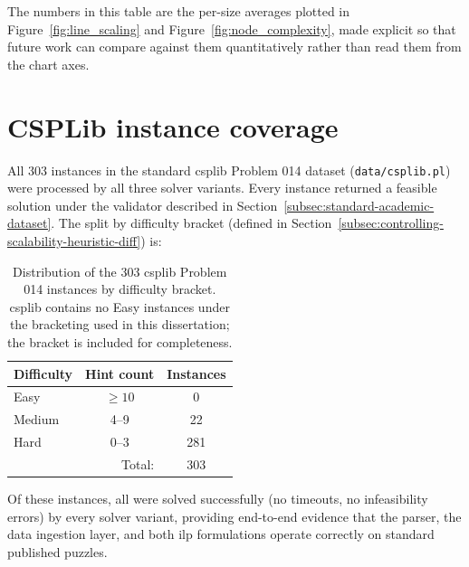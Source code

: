 The numbers in this table are the per-size averages plotted in Figure~\ref{fig:line_scaling} and Figure~\ref{fig:node_complexity}, made explicit so that future work can compare against them quantitatively rather than read them from the chart axes.

\section{CSPLib instance coverage}\label{app:csplib-coverage}

All 303 instances in the standard \gls{csplib} Problem 014 dataset (\verb|data/csplib.pl|) were processed by all three solver variants. Every instance returned a feasible solution under the validator described in Section~\ref{subsec:standard-academic-dataset}. The split by difficulty bracket (defined in Section~\ref{subsec:controlling-scalability-heuristic-diff}) is:

\begin{table}[h]
  \centering
  \caption{Distribution of the 303 \gls{csplib} Problem 014 instances by difficulty bracket. \gls{csplib} contains no Easy instances under the bracketing used in this dissertation; the bracket is included for completeness.}
  \label{tab:appendix-csplib}
  \begin{tabular}{lcc}
    \toprule
    Difficulty & Hint count & Instances \\
    \midrule
    Easy   & $\geq 10$  & 0   \\
    Medium & 4--9       & 22 \\
    Hard   & 0--3       & 281 \\
    \midrule
    \multicolumn{2}{r}{Total:} & 303 \\
    \bottomrule
  \end{tabular}
\end{table}

Of these instances, all were solved successfully (no timeouts, no infeasibility errors) by every solver variant, providing end-to-end evidence that the parser, the data ingestion layer, and both \gls{ilp} formulations operate correctly on standard published puzzles.

